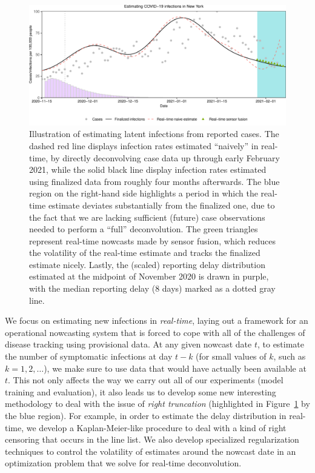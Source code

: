 \documentclass[sts]{imsart}
\theoremstyle{plain}
\theoremstyle{definition}
\theoremstyle{remark}
\begin{document}
\begin{figure}[tb]
\centering
\includegraphics[width=0.95\linewidth]{./figures/nowcast_demo.pdf}
\caption{Illustration of estimating latent infections from reported cases. The 
  dashed red line displays infection rates estimated ``naively'' in real-time,
  by directly deconvolving case data up through early February 2021, while
  the solid black line display infection rates estimated using finalized data
  from roughly four months afterwards. The blue region on the
  right-hand side highlights a period in which the real-time estimate deviates 
  substantially from the finalized one, due to the fact that we are lacking 
  sufficient (future) case observations needed to perform a ``full''
  deconvolution. The green triangles represent real-time nowcasts made by sensor
  fusion, which reduces the volatility of the real-time estimate and tracks the
  finalized estimate nicely. Lastly, the (scaled) reporting delay distribution
  estimated at the midpoint of November 2020 is drawn in purple, with the median
  reporting delay (8 days) marked as a dotted gray line.} 
\label{fig:deconv_demo}
\end{figure}

We focus on estimating new infections in \emph{real-time}, laying out a
framework for an operational nowcasting system that is forced to cope with all
of the challenges of disease tracking using provisional data. At any given
nowcast date $t$, to estimate the number of symptomatic infections at day $t-k$
(for small values of $k$, such as $k=1,2,\ldots$), we make sure to use data that
would have actually been available at $t$. This not only affects the way we
carry out all of our experiments (model training and evaluation), it also leads
us to develop some new interesting methodology to deal with the issue of
\emph{right truncation} (highlighted in Figure~\ref{fig:deconv_demo} by the blue
region). For example, in order to estimate the delay distribution in real-time,
we develop a Kaplan-Meier-like procedure to deal with a kind of right censoring
that occurs in the line list. We also develop specialized regularization techniques
to control the volatility of estimates around the nowcast date in an
optimization problem that we solve for real-time deconvolution.    
\end{document}
